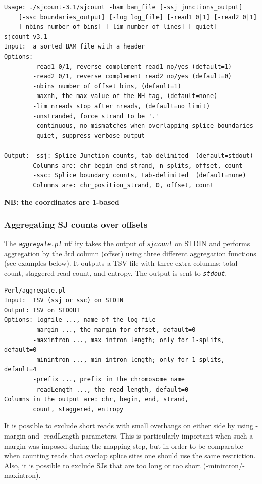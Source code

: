 \documentclass{article}
\newcommand{\prog}[1]{{\tt\em #1}}
\begin{document}
\begin{verbatim}
Usage: ./sjcount-3.1/sjcount -bam bam_file [-ssj junctions_output] 
    [-ssc boundaries_output] [-log log_file] [-read1 0|1] [-read2 0|1] 
    [-nbins number_of_bins] [-lim number_of_lines] [-quiet]
sjcount v3.1
Input:  a sorted BAM file with a header
Options:
        -read1 0/1, reverse complement read1 no/yes (default=1)
        -read2 0/1, reverse complement read2 no/yes (default=0)
        -nbins number of offset bins, (default=1)
        -maxnh, the max value of the NH tag, (default=none)
        -lim nreads stop after nreads, (default=no limit)
        -unstranded, force strand to be '.'
        -continuous, no mismatches when overlapping splice boundaries
        -quiet, suppress verbose output

Output: -ssj: Splice Junction counts, tab-delimited  (default=stdout)
        Columns are: chr_begin_end_strand, n_splits, offset, count
        -ssc: Splice boundary counts, tab-delimited  (default=none)
        Columns are: chr_position_strand, 0, offset, count
\end{verbatim}
{\bf NB: the coordinates are 1-based}


\subsubsection{Aggregating SJ counts over offsets}
The \prog{aggregate.pl} utility takes the output of \prog{sjcount} on STDIN and performs aggregation by the 3rd column (offset) using three different aggregation functions 
(see examples below). It outputs a TSV file with three extra columns: total count, staggered read count, and entropy. The output is sent to \prog{stdout}. 
\begin{verbatim}
Perl/aggregate.pl   
Input:  TSV (ssj or ssc) on STDIN
Output: TSV on STDOUT
Options:-logfile ..., name of the log file
        -margin ..., the margin for offset, default=0
        -maxintron ..., max intron length; only for 1-splits, default=0
        -minintron ..., min intron length; only for 1-splits, default=4
        -prefix ..., prefix in the chromosome name
        -readLength ..., the read length, default=0
Columns in the output are: chr, begin, end, strand, 
        count, staggered, entropy
\end{verbatim}
It is possible to exclude short reads with small overhangs on either side by using -margin and -readLength parameters. This is particularly important when such a margin 
was imposed during the mapping step, but in order to be comparable when counting reads that overlap splice sites one should use the same restriction. Also, it is possible 
to exclude SJs that are too long or too short (-minintron/-maxintron).
\end{document}
